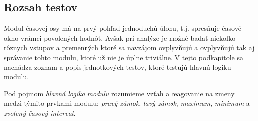 \documentclass[
  digital, %
  twoside, %
  notable,   %
  nolof,   %
  nolot,   %
]{fithesis3}
\begin{document}
\subsection{Rozsah testov}
\label{sec:tests}
Modul časovej osy má na prvý pohľad jednoduchú úlohu, t.j. spresňuje časové okno vrámci povolených hodnôt. Avšak pri analýze je možné badať niekoľko rôznych vstupov a premenných ktoré sa navzájom ovplyvňujú a ovplyvňujú tak aj správanie tohto modulu, ktoré už nie je úplne triviálne. V tejto podkapitole sa nachádza zoznam a popis jednotkových testov, ktoré testujú hlavnú logiku modulu.

Pod pojmom \textit{hlavná logika modulu} rozumieme vzťah a reagovanie na zmeny medzi týmito prvkami modulu: \textit{pravý zámok}, \textit{ľavý zámok}, \textit{maximum}, \textit{minimum} a \textit{zvolený časový interval}.
\end{document}
